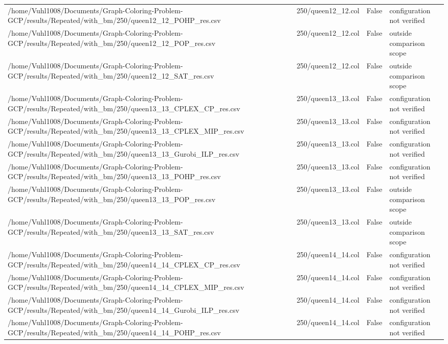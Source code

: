 \begin{table}[htbp]
\begin{tabular}{llll}
/home/Vuhl1008/Documents/Graph-Coloring-Problem-GCP/results/Repeated/with\_bm/250/queen12\_12\_POHP\_res.csv & 250/queen12\_12.col & False & configuration not verified \\
/home/Vuhl1008/Documents/Graph-Coloring-Problem-GCP/results/Repeated/with\_bm/250/queen12\_12\_POP\_res.csv & 250/queen12\_12.col & False & outside comparison scope \\
/home/Vuhl1008/Documents/Graph-Coloring-Problem-GCP/results/Repeated/with\_bm/250/queen12\_12\_SAT\_res.csv & 250/queen12\_12.col & False & outside comparison scope \\
/home/Vuhl1008/Documents/Graph-Coloring-Problem-GCP/results/Repeated/with\_bm/250/queen13\_13\_CPLEX\_CP\_res.csv & 250/queen13\_13.col & False & configuration not verified \\
/home/Vuhl1008/Documents/Graph-Coloring-Problem-GCP/results/Repeated/with\_bm/250/queen13\_13\_CPLEX\_MIP\_res.csv & 250/queen13\_13.col & False & configuration not verified \\
/home/Vuhl1008/Documents/Graph-Coloring-Problem-GCP/results/Repeated/with\_bm/250/queen13\_13\_Gurobi\_ILP\_res.csv & 250/queen13\_13.col & False & configuration not verified \\
/home/Vuhl1008/Documents/Graph-Coloring-Problem-GCP/results/Repeated/with\_bm/250/queen13\_13\_POHP\_res.csv & 250/queen13\_13.col & False & configuration not verified \\
/home/Vuhl1008/Documents/Graph-Coloring-Problem-GCP/results/Repeated/with\_bm/250/queen13\_13\_POP\_res.csv & 250/queen13\_13.col & False & outside comparison scope \\
/home/Vuhl1008/Documents/Graph-Coloring-Problem-GCP/results/Repeated/with\_bm/250/queen13\_13\_SAT\_res.csv & 250/queen13\_13.col & False & outside comparison scope \\
/home/Vuhl1008/Documents/Graph-Coloring-Problem-GCP/results/Repeated/with\_bm/250/queen14\_14\_CPLEX\_CP\_res.csv & 250/queen14\_14.col & False & configuration not verified \\
/home/Vuhl1008/Documents/Graph-Coloring-Problem-GCP/results/Repeated/with\_bm/250/queen14\_14\_CPLEX\_MIP\_res.csv & 250/queen14\_14.col & False & configuration not verified \\
/home/Vuhl1008/Documents/Graph-Coloring-Problem-GCP/results/Repeated/with\_bm/250/queen14\_14\_Gurobi\_ILP\_res.csv & 250/queen14\_14.col & False & configuration not verified \\
/home/Vuhl1008/Documents/Graph-Coloring-Problem-GCP/results/Repeated/with\_bm/250/queen14\_14\_POHP\_res.csv & 250/queen14\_14.col & False & configuration not verified \\

\end{tabular}
\end{table}

